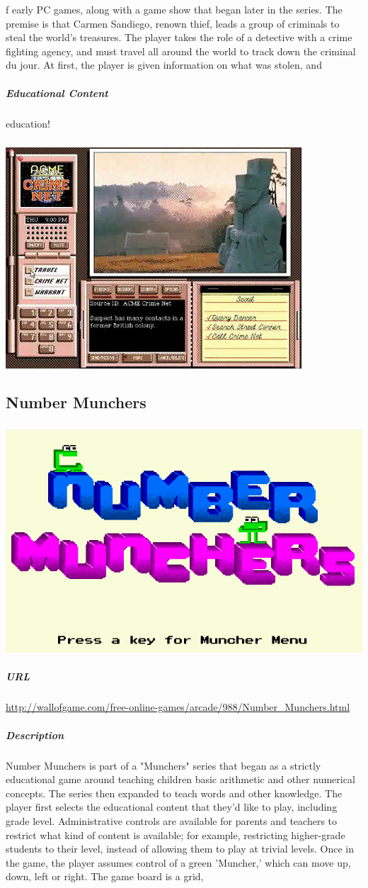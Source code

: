 f early PC games, along with a game show that began later in the series. The premise is that Carmen Sandiego, renown thief, leads a group of criminals to steal the world's treasures. The player takes the role of a detective with a crime fighting agency, and must travel all around the world to track down the criminal du jour. At first, the player is given information on what was stolen, and \subparagraph{Educational Content}education!\subparagraph{}\includegraphics[width = \textwidth]{img/carmen_screen.jpg}\newpage\subsection{Number Munchers}\subparagraph{}\includegraphics[width = \textwidth]{img/munchers_title.png}\subparagraph{URL}\url{http://wallofgame.com/free-online-games/arcade/988/Number_Munchers.html}\subparagraph{Description}Number Munchers is part of a "Munchers" series that began as a strictly educational game around teaching children basic arithmetic and other numerical concepts. The series then expanded to teach words and other knowledge. The player first selects the educational content that they'd like to play, including grade level. Administrative controls are available for parents and teachers to restrict what kind of content is available; for example, restricting higher-grade students to their level, instead of allowing them to play at trivial levels. Once in the game, the player assumes control of a green 'Muncher,' which can move up, down, left or right. The game board is a grid, 